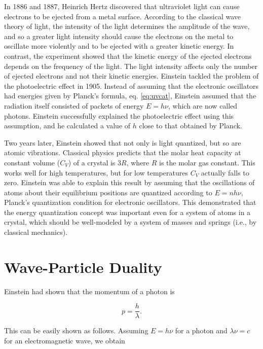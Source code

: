 \documentclass[
  9pt,
]{extbook}
\theoremstyle{definition}
\theoremstyle{definition}
\theoremstyle{definition}
\theoremstyle{remark}
\begin{document}
In 1886 and 1887, Heinrich Hertz discovered that ultraviolet light can cause electrons to be ejected from a metal surface. According to the classical wave theory of light, the intensity of the light determines the amplitude of the wave, and so a greater light intensity should cause the electrons on the metal to oscillate more violently and to be ejected with a greater kinetic energy. In contrast, the experiment showed that the kinetic energy of the ejected electrons depends on the frequency of the light. The light intensity affects only the number of ejected electrons and not their kinetic energies.
Einstein tackled the problem of the photoelectric effect in 1905. Instead of assuming that the electronic oscillators had energies given by Planck's formula, eq. \eqref{eq:uvcat}, Einstein assumed that the radiation itself consisted of packets of energy \(E = h \nu\), which are now called photons. Einstein successfully explained the photoelectric effect using this assumption, and he calculated a value of \(h\) close to that obtained by Planck.

Two years later, Einstein showed that not only is light quantized, but so are atomic vibrations. Classical physics predicts that the molar heat capacity at constant volume (\(C_V\)) of a crystal is \(3 R\), where \(R\) is the molar gas constant. This works well for high temperatures, but for low temperatures \(C_V\) actually falls to zero. Einstein was able to explain this result by assuming that the oscillations of atoms about their equilibrium positions are quantized according to \(E = n h \nu\), Planck's quantization condition for electronic oscillators. This demonstrated that the energy quantization concept was important even for a system of atoms in a crystal, which should be well-modeled by a system of masses and springs (i.e., by classical mechanics).

\hypertarget{wave-particle-duality}{%
\section{Wave-Particle Duality}\label{wave-particle-duality}}

Einstein had shown that the momentum of a photon is

\begin{equation}
p = \frac{h}{\lambda}.
\label{eq:wp1}
\end{equation}

This can be easily shown as follows. Assuming \(E = h \nu\) for a photon and \(\lambda \nu = c\) for an electromagnetic wave, we obtain
\end{document}
